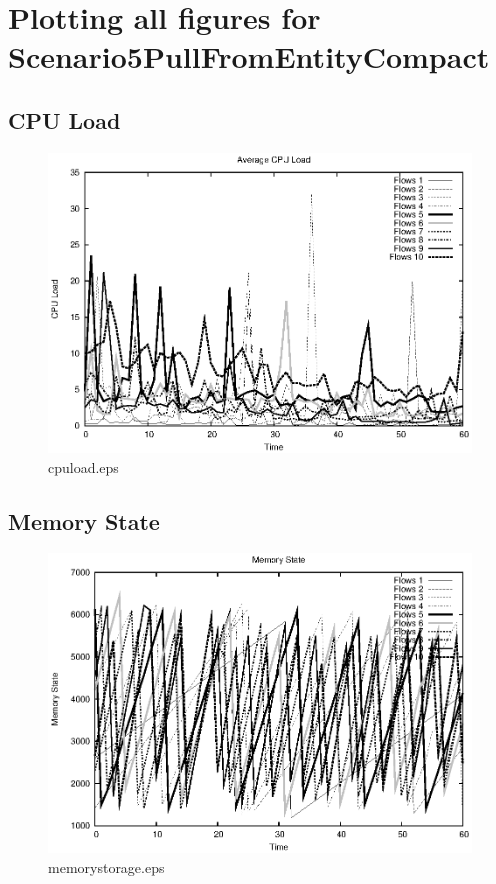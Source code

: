 \documentclass{elsart}
\begin{document}
\section{Plotting all figures for Scenario5PullFromEntityCompact}
\subsection{CPU Load}

\begin{figure}[ht]
\centering
\includegraphics{Scenario5PullFromEntityCompact/cpuload.eps}
\caption{cpuload.eps}\label{fig:cpuload}
\end{figure}

\clearpage
\subsection{Memory State}

\begin{figure}[ht]
\centering
\includegraphics{Scenario5PullFromEntityCompact/memorystorage.eps}
\caption{memorystorage.eps}\label{fig:memorystorage}
\end{figure}
\end{document}

